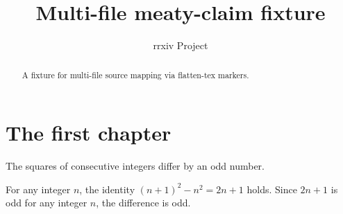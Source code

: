 \documentclass{rrxiv}
\title{Multi-file meaty-claim fixture}
\author{rrxiv Project}
\begin{document}
\maketitle

\begin{abstract}
A fixture for multi-file source mapping via flatten-tex markers.
\end{abstract}

%

\section{The first chapter}
\label{sec:ch1}

\begin{claim}
\label{prop:stack}
The squares of consecutive integers differ by an odd number.
\end{claim}

\begin{evidence}
\label{ev:stack}

For any integer $n$, the identity $(n+1)^2 - n^2 = 2n + 1$ holds.
Since $2n + 1$ is odd for any integer $n$, the difference is odd.
\end{evidence}
\end{document}
